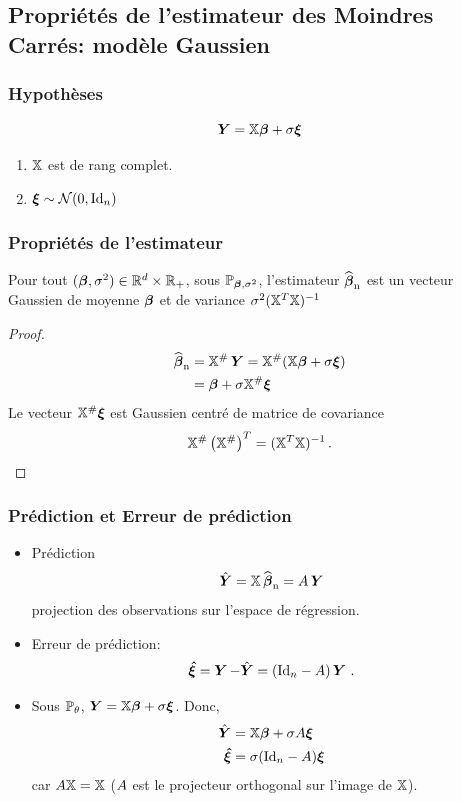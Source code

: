 \subsection{Propriétés de l'estimateur des Moindres Carrés: modèle Gaussien}

\begin{frame}
\frametitle{Hypothèses}
\[
\operatorname{\boldsymbol{Y}}= \mathbb{X} \boldsymbol{\beta} + \sigma \boldsymbol{\xi}
\]
\begin{enumerate}
\item \alert<1>{$\mathbb{X}$ est de rang complet.}
\item \alert<2>{$\boldsymbol{\xi} \sim \mathcal{N}(0,\mathrm{Id}_{n})$}
\end{enumerate}
\end{frame}


\begin{frame}
\frametitle{Propriétés de l'estimateur}
\begin{theo}
Pour tout $(\boldsymbol{\beta},\sigma^2) \in \mathbb{R}^d \times \mathbb{R}_+$, sous $\operatorname{{\mathbb P}}_{\boldsymbol{\beta},\sigma^2}$, l'estimateur
$\operatorname{\widehat{\boldsymbol{\beta}}_n}$ est un vecteur Gaussien de moyenne $\boldsymbol{\beta}$ et de variance $\sigma^2(\mathbb{X}^T \mathbb{X})^{-1}$
\end{theo}
\begin{proof}
\begin{align*}
\operatorname{\widehat{\boldsymbol{\beta}}_n}
&= \mathbb{X}^{\#} \operatorname{\boldsymbol{Y}} = \mathbb{X}^{\#} (\mathbb{X} \boldsymbol{\beta} + \sigma \boldsymbol{\xi}) \\
&= \boldsymbol{\beta} + \sigma \mathbb{X}^{\#} \boldsymbol{\xi}
\end{align*}
Le vecteur $\mathbb{X}^{\#} \boldsymbol{\xi}$ est Gaussien centré de matrice de covariance
\[
\mathbb{X}^{\#} \left( \mathbb{X}^{\#} \right)^T = (\mathbb{X}^T \mathbb{X})^{-1} \,.
\]
\end{proof}
\end{frame}


\begin{frame}
\frametitle{Prédiction et Erreur de prédiction}
\begin{itemize}
\item \alert{Prédiction}
\[
\hat{\boldsymbol{Y}}= \mathbb{X} \operatorname{\widehat{\boldsymbol{\beta}}_n} = A \operatorname{\boldsymbol{Y}}
\]
projection des observations sur l'espace de régression.
\item \alert{Erreur de prédiction}:
\[
\boldsymbol{\hat{\xi}} = \operatorname{\boldsymbol{Y}} - \hat{\boldsymbol{Y}} = (\mathrm{Id}_{n} - A) \operatorname{\boldsymbol{Y}} \,.
\]
\item Sous $\operatorname{{\mathbb P}}_\theta$, $\operatorname{\boldsymbol{Y}}= \mathbb{X} \boldsymbol{\beta} +  \sigma \boldsymbol{\xi}$. Donc,
\begin{align*}
\hat{\boldsymbol{Y}}    &= \mathbb{X} \boldsymbol{\beta} + \sigma A \boldsymbol{\xi} \\
\boldsymbol{\hat{\xi}}  &= \sigma (\mathrm{Id}_{n}-A) \boldsymbol{\xi}
\end{align*}
car $A \mathbb{X}= \mathbb{X}$ ($A$ est le projecteur orthogonal sur l'image de $\mathbb{X}$).
\end{itemize}
\end{frame}


